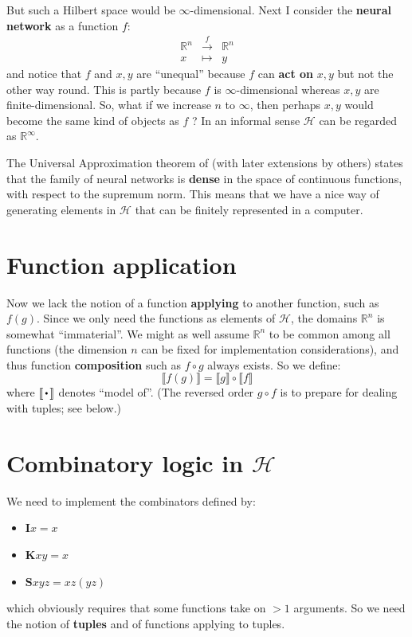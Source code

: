 But such a Hilbert space would be $\infty$-dimensional.  Next I consider the \textbf{neural network} as a function $f$:
\begin{eqnarray}
\mathbb{R}^n & \stackrel{f}{\longrightarrow} & \mathbb{R}^n \\
x & \mapsto & y \nonumber
\end{eqnarray}
and notice that $f$ and $x, y$ are ``unequal'' because $f$ can \textbf{act on} $x, y$ but not the other way round.  This is partly because $f$ is $\infty$-dimensional whereas $x, y$ are finite-dimensional.  So, what if we increase $n$ to $\infty$, then perhaps $x, y$ would become the same kind of objects as $f$ ?  In an informal sense $\mathcal{H}$ can be regarded as $\mathbb{R}^{\infty}$.

The Universal Approximation theorem of \parencite{Cybenko1989} (with later extensions by others) states that the family of neural networks is \textbf{dense} in the space of continuous functions, with respect to the supremum norm.  This means that we have a nice way of generating elements in $\mathcal{H}$ that can be finitely represented in a computer.

\section{Function application}

Now we lack the notion of a function \textbf{applying} to another function, such as $f(g)$.  Since we only need the functions as elements of $\mathcal{H}$, the domains $\mathbb{R}^n$ is somewhat ``immaterial''.  We might as well assume $\mathbb{R}^n$ to be common among all functions (the dimension $n$ can be fixed for implementation considerations), and thus function \textbf{composition} such as $f \circ g$ always exists.  So we define:
\begin{equation}
\llbracket f(g) \rrbracket = \llbracket g \rrbracket \circ \llbracket f \rrbracket
\end{equation}
where $\llbracket \Cdot \rrbracket$ denotes ``model of''.  (The reversed order $g \circ f$ is to prepare for dealing with tuples; see below.)

\section{Combinatory logic in $\mathcal{H}$}

We need to implement the combinators defined by:
\begin{itemize}
	\item $\mathbf{I} x = x$
	\item $\mathbf{K} x y = x$
	\item $\mathbf{S} x y z = xz (yz)$
\end{itemize}
which obviously requires that some functions take on $> 1$ arguments.  So we need the notion of \textbf{tuples} and of functions applying to tuples.

